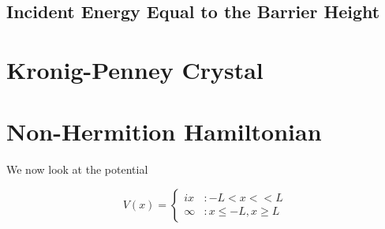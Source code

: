 \documentclass{article}
\begin{document}
\subsection{Incident Energy Equal to the Barrier Height}

\section{Kronig-Penney Crystal}

\section{Non-Hermition Hamiltonian}

We now look at the potential 

\[V(x) = \left\{
  \begin{array}{lr}
    ix &  : -L < x < < L \\
    \infty & : x \leq -L , x \geq L 
  \end{array}
\right.
\]
\end{document}
